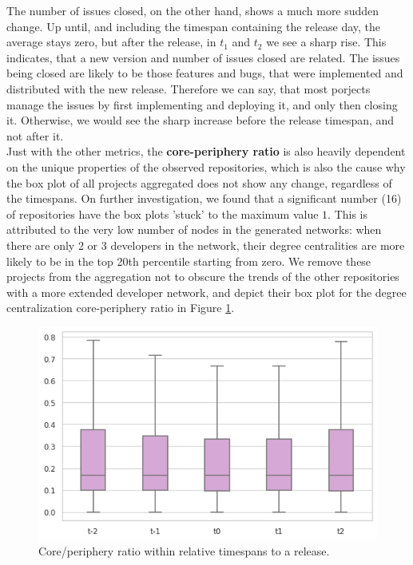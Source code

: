 The number of issues closed, on the other hand, shows a much more sudden change. Up until, and including the timespan containing the release day, the average stays zero, but after the release, in $t_1$ and $t_2$ we see a sharp rise. This indicates, that a new version and number of issues closed are related. The issues being closed are likely to be those features and bugs, that were implemented and distributed with the new release. Therefore we can say, that most porjects manage the issues by first implementing and deploying it, and only then closing it. Otherwise, we would see the sharp increase before the release timespan, and not after it. \\

Just with the other metrics, the \textbf{core-periphery ratio} is also heavily dependent on the unique properties of the observed repositories, which is also the cause why the box plot of all projects aggregated does not show any change, regardless of the timespans. On further investigation, we found that a significant number (16) of repositories have the box plots 'stuck' to the maximum value $1$. This is attributed to the very low number of nodes in the generated networks: when there are only 2 or 3 developers in the network, their degree centralities are more likely to be in the top 20th percentile starting from zero. We remove these projects from the aggregation not to obscure the trends of the other repositories with a more extended developer network, and depict their box plot for the degree centralization core-periphery ratio in Figure \ref{fig:cp-box}.

\begin{figure}
    \centering
    \includegraphics[width=\textwidth]{figures/quantitative/boxplots/cp-ratio.png}
    \caption{Core/periphery ratio within relative timespans to a release.}
    \label{fig:cp-box}
\end{figure}

